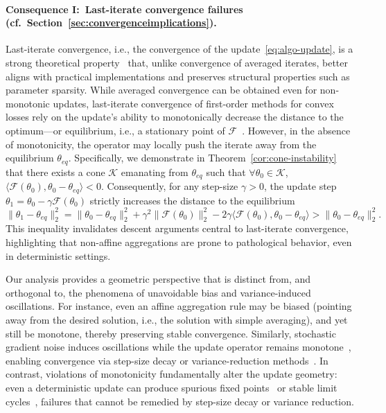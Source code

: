 \documentclass[twoside,11pt]{article}
\newcommand\mc{\mathcal}
\newcommand{\F}{\mathcal{F}}
\begin{document}
\paragraph{Consequence I:\ Last-iterate convergence failures (cf.~Section~\ref{sec:convergenceimplications}).}
Last-iterate convergence, i.e., the convergence of the update~\eqref{eq:algo-update}, is a strong theoretical property~\citep{bach-ltfp,doi:10.1137/24M1717762-last-iterate-cv,preobrazhenskaia2026last-iterate-adagrad,kornowski2026gradient-last-iterate-speed-cv} that, unlike convergence of averaged iterates, better aligns with practical implementations and preserves structural properties such as parameter sparsity. 
While averaged convergence can be obtained even for non-monotonic updates, last-iterate convergence of first-order methods for convex losses rely on the update's ability to monotonically decrease the distance to the optimum---or equilibrium, i.e., a stationary point of $\F$~\citep{Bauschke2011ConvexAA,primer-monotone}.
However, in the absence of monotonicity, the operator may locally push the iterate away from the equilibrium $\theta_{eq}$. 
Specifically, we demonstrate in Theorem~\ref{cor:cone-instability} that there exists a cone $\mc{K}$ emanating from $\theta_{eq}$ such that $\forall \theta_0 \in \mc{K}$, $\langle \F(\theta_0), \theta_0 - \theta_{eq} \rangle < 0$.
Consequently, for any step-size $\gamma > 0$, the update step $\theta_1 = \theta_0 - \gamma \F(\theta_0)$ strictly increases the distance to the equilibrium
\begin{equation*}
    \| \theta_{1} - \theta_{eq} \|_2^2 
    = \| \theta_0 - \theta_{eq} \|_2^2 + \gamma^2 \| \F(\theta_0) \|_2^2 - 2\gamma \langle \F(\theta_0), \theta_0 - \theta_{eq} \rangle
    > \| \theta_0 - \theta_{eq} \|_2^2.
\end{equation*}
This inequality invalidates descent arguments central to last-iterate convergence, highlighting that non-affine aggregations are prone to pathological behavior, even in deterministic settings.

Our analysis provides a geometric perspective that is distinct from, and orthogonal to, the phenomena of unavoidable bias and variance-induced oscillations. 
For instance, even an affine aggregation rule may be biased (pointing away from the desired solution, i.e., the solution with simple averaging), and yet still be monotone, thereby preserving stable convergence. 
Similarly, stochastic gradient noise induces oscillations while the update operator remains monotone~\citep{dieuleveut2020bridging}, enabling convergence via step-size decay \citep{NIPS2011_40008b9a-moulines} or variance-reduction methods~\citep{defazio2014saga}.
In contrast, violations of monotonicity fundamentally alter the update geometry: even a deterministic update can produce spurious fixed points~\citep{reddi2018convergenceadam} or stable limit cycles~\citep[Figure 6]{heavy-ball-limit-cycle}, failures that cannot be remedied by step-size decay or variance reduction.
\end{document}
